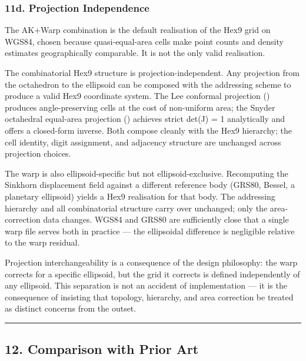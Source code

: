\documentclass[
  11pt,
  a4paper,
]{article}
\begin{document}
\subsubsection{11d. Projection
Independence}\label{d.-projection-independence}

The AK+Warp combination is the default realisation of the Hex9 grid on
WGS84, chosen because quasi-equal-area cells make point counts and
density estimates geographically comparable. It is not the only valid
realisation.

The combinatorial Hex9 structure is projection-independent. Any
projection from the octahedron to the ellipsoid can be composed with the
addressing scheme to produce a valid Hex9 coordinate system. The Lee
conformal projection ()
produces angle-preserving cells at the cost of non-uniform area; the
Snyder octahedral equal-area projection
() achieves strict det(J) = 1
analytically and offers a closed-form inverse. Both compose cleanly with
the Hex9 hierarchy; the cell identity, digit assignment, and adjacency
structure are unchanged across projection choices.

The warp is also ellipsoid-specific but not ellipsoid-exclusive.
Recomputing the Sinkhorn displacement field against a different
reference body (GRS80, Bessel, a planetary ellipsoid) yields a Hex9
realisation for that body. The addressing hierarchy and all
combinatorial structure carry over unchanged; only the area-correction
data changes. WGS84 and GRS80 are sufficiently close that a single warp
file serves both in practice --- the ellipsoidal difference is
negligible relative to the warp residual.

Projection interchangeability is a consequence of the design philosophy:
the warp corrects for a specific ellipsoid, but the grid it corrects is
defined independently of any ellipsoid. This separation is not an
accident of implementation --- it is the consequence of insisting that
topology, hierarchy, and area correction be treated as distinct concerns
from the outset.

\begin{center}\rule{0.5\linewidth}{0.5pt}\end{center}

\subsection{12. Comparison with Prior
Art}\label{comparison-with-prior-art}
\end{document}
